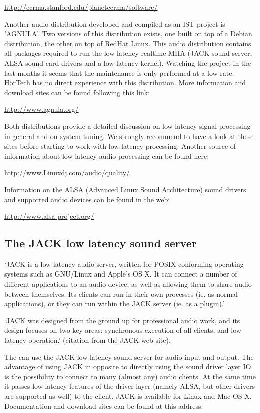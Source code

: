 \url{http://ccrma.stanford.edu/planetccrma/software/}

Another audio distribution developed and compiled as an IST project
is 'AGNULA'. Two versions of this distribution exists, one built on
top of a Debian distribution, the other on top of RedHat Linux. This
audio distribution contains all packages required to run the low
latency realtime MHA (JACK sound server, ALSA sound card drivers and a
low latency kernel). Watching the project in the last months it seems
that the maintenance is only performed at a low rate. H\"orTech has no
direct experience with this distribution. More information and
download sites can be found following this link:

\url{http://www.agnula.org/}

Both distributions provide a detailed discussion on low latency signal
processing in general and on system tuning. We strongly recommend to
have a look at these sites before starting to work with low latency
processing. Another source of information about low latency audio
processing can be found here:

\url{http://www.Linuxdj.com/audio/quality/}

Information on the ALSA (Advanced Linux Sound Architecture) sound
drivers and supported audio devices can be found in the web:

\url{http://www.alsa-project.org/}


\subsection{The JACK low latency sound server}
\label{sec:jack}

`JACK is a low-latency audio server, written for POSIX-conforming
operating systems such as GNU/Linux and Apple's OS X. It can connect a
number of different applications to an audio device, as well as
allowing them to share audio between themselves. Its clients can run
in their own processes (ie. as normal applications), or they can run
within the JACK server (ie. as a plugin).'

`JACK was designed from the ground up for professional audio work, and
its design focuses on two key areas: synchronous execution of all
clients, and low latency operation.' (citation from the JACK web site).

The \mhad{} can use the JACK low latency sound
server for audio input and output.
%
The advantage of using JACK in opposite to directly using the sound
driver layer IO is the possibility to connect to many (almost any)
audio clients.
%
At the same time it passes low latency features of the driver layer
(namely ALSA, but other drivers are supported as well) to the client.
%
JACK is available for Linux and Mac OS X. Documentation and download
sites can be found at this address:

